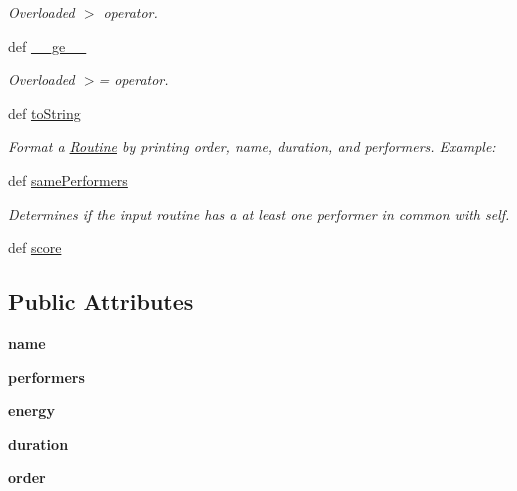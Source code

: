 \begin{DoxyCompactItemize}
\begin{DoxyCompactList}\small\item\em Overloaded $>$ operator. \end{DoxyCompactList}\item 
def \hyperlink{classdance__scheduler_1_1Routine_a0e07be06629e661868f0dd32e9d40cac}{\-\_\-\-\_\-ge\-\_\-\-\_\-}
\begin{DoxyCompactList}\small\item\em Overloaded $>$= operator. \end{DoxyCompactList}\item 
def \hyperlink{classdance__scheduler_1_1Routine_a159f5bc70530a370ec2465f8cbb919c6}{to\-String}
\begin{DoxyCompactList}\small\item\em Format a \hyperlink{classdance__scheduler_1_1Routine}{Routine} by printing order, name, duration, and performers. Example\-: \end{DoxyCompactList}\item 
def \hyperlink{classdance__scheduler_1_1Routine_a101fa9e4936b70938b642248f199d95d}{same\-Performers}
\begin{DoxyCompactList}\small\item\em Determines if the input routine has a at least one performer in common with self. \end{DoxyCompactList}\item 
def \hyperlink{classdance__scheduler_1_1Routine_a4fba875fdeff1b21b627dbcad7d4b1fd}{score}
\end{DoxyCompactItemize}
\subsection*{Public Attributes}
\begin{DoxyCompactItemize}
\item 
\hypertarget{classdance__scheduler_1_1Routine_a350ed26a6b29ae239fed5bfc341c6921}{{\bfseries name}}\label{classdance__scheduler_1_1Routine_a350ed26a6b29ae239fed5bfc341c6921}

\item 
\hypertarget{classdance__scheduler_1_1Routine_abd63adeeaf42087ca3ffc83871003e0f}{{\bfseries performers}}\label{classdance__scheduler_1_1Routine_abd63adeeaf42087ca3ffc83871003e0f}

\item 
\hypertarget{classdance__scheduler_1_1Routine_ad0c622e38efb07a92fa9e2894240ba76}{{\bfseries energy}}\label{classdance__scheduler_1_1Routine_ad0c622e38efb07a92fa9e2894240ba76}

\item 
\hypertarget{classdance__scheduler_1_1Routine_ada284eccd6e4d5fb6e30269c84c5038d}{{\bfseries duration}}\label{classdance__scheduler_1_1Routine_ada284eccd6e4d5fb6e30269c84c5038d}

\item 
\hypertarget{classdance__scheduler_1_1Routine_aeeb1207380b5309ee9f89f2a9a5da218}{{\bfseries order}}\label{classdance__scheduler_1_1Routine_aeeb1207380b5309ee9f89f2a9a5da218}

\end{DoxyCompactItemize}


